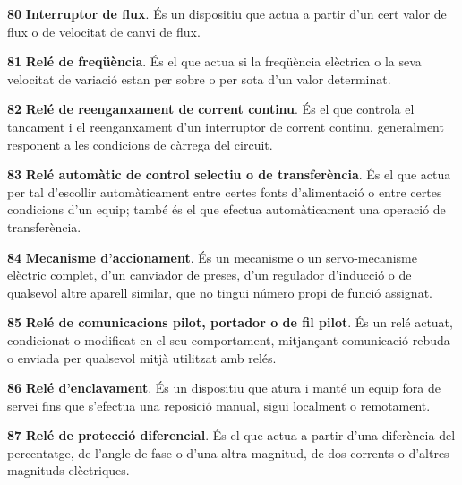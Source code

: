 \begin{multicols}{2}
\begin{list}{}
\item[\textbf{80}]   
\textbf{Interruptor de flux}. És un dispositiu que actua a partir d'un cert valor de flux o de velocitat de canvi de flux.

\item[\textbf{81}]   
\textbf{Relé de freqüència}. És el que actua
si la freqüència elèctrica o la seva velocitat de variació estan per sobre o per sota d'un valor determinat.

\item[\textbf{82}]   
\textbf{Relé de reenganxament de corrent continu}. És el que controla el tancament i el reenganxament d'un
interruptor de corrent continu, generalment responent a les condicions de càrrega del
circuit.

\item[\textbf{83}]  
\textbf{Relé automàtic de control selectiu o de transferència}. És
el que actua per tal d'escollir automàticament entre certes fonts
d'alimentació o entre certes condicions d'un equip; també és el que
efectua automàticament una operació de transferència.

\item[\textbf{84}]   
\textbf{Mecanisme d'accionament}. És un
mecanisme o un servo-mecanisme elèctric complet,  d'un canviador de
preses, d'un regulador d'inducció o de qualsevol altre aparell
similar, que no tingui número propi de funció assignat.

\item[\textbf{85}]   
\textbf{Relé de comunicacions pilot, portador o de fil pilot}. És un relé actuat, condicionat o modificat en el seu comportament, mitjançant comunicació rebuda o enviada per qualsevol mitjà utilitzat amb relés.

\item[\textbf{86}]   
\textbf{Relé d'enclavament}. És un dispositiu que atura i manté un equip fora de servei fins que s'efectua una reposició manual, sigui localment o remotament.

\item[\textbf{87}]   
\textbf{Relé de protecció diferencial}. És el que actua a partir d'una diferència  del percentatge, de l'angle de fase o d'una altra magnitud, de dos corrents
o d'altres magnituds elèctriques.


\end{list}
\end{multicols}
